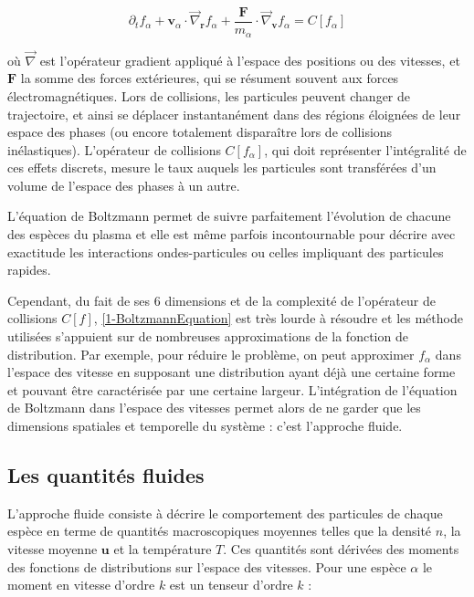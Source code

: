 \begin{refsection}
\begin{equation}
\label{1-BoltzmannEquation}
\partial_tf_\alpha+\mathbf{v}_\alpha\cdot\vec\nabla_\mathbf{r}f_\alpha+
\frac{\mathbf{F}}{m_\alpha}\cdot\vec\nabla_{\mathbf{v}}f_\alpha
=C[f_\alpha]
\end{equation}

où $\vec\nabla$ est l'opérateur gradient appliqué à l'espace des positions ou
des vitesses, et $\mathbf{F}$ la somme des forces extérieures, qui se résument
souvent aux forces électromagnétiques. Lors de collisions, les particules peuvent changer de
trajectoire, et ainsi se déplacer instantanément dans des régions éloignées de leur espace des
phases (ou encore totalement disparaître lors de collisions inélastiques).
L'opérateur de collisions $C[f_\alpha]$, qui doit représenter l'intégralité de
ces effets discrets, mesure le taux auquels les particules sont transférées d'un
volume de l'espace des phases à un autre.

 L'équation de Boltzmann permet de
suivre parfaitement l'évolution de chacune des espèces du plasma et elle est
même parfois incontournable pour décrire avec exactitude les interactions
ondes-particules ou celles impliquant des particules rapides. 

Cependant, du fait de ses 6 dimensions et de la complexité de
l'opérateur de collisions $C[f]$, \eqref{1-BoltzmannEquation} est très
lourde à résoudre et les méthode utilisées
s'appuient sur de nombreuses approximations de la fonction de
distribution\parencite{HagelaarHDR}. Par exemple, pour réduire le problème, on
peut approximer $f_\alpha$ dans l'espace des vitesse en supposant une
distribution ayant déjà une certaine forme et pouvant être caractérisée par une
certaine largeur. L'intégration de l'équation de Boltzmann dans l'espace des
vitesses permet alors de ne garder que les dimensions spatiales et temporelle
du système : c'est l'approche fluide.

\subsection{Les quantités fluides}
L'approche fluide consiste à décrire le comportement des particules de chaque
espèce en terme de quantités macroscopiques moyennes telles que la densité $n$,
la vitesse moyenne $\mathbf u$ et la température $T$. Ces quantités sont dérivées
des moments des fonctions de distributions sur l'espace des vitesses.
Pour une espèce $\alpha$ le moment en vitesse d'ordre $k$ est un tenseur d'ordre
$k$ :


\end{refsection}
